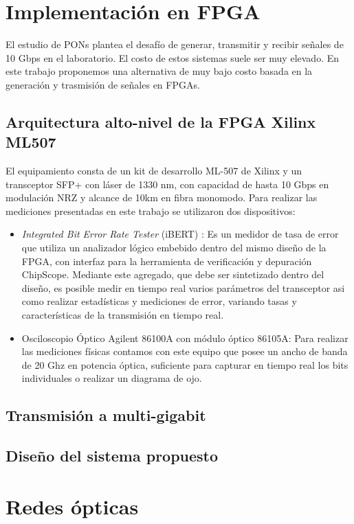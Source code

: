 \section{Implementación en FPGA}
El estudio de PONs plantea el desafío de generar, transmitir y recibir
señales de 10 Gbps en el laboratorio. El costo de estos sistemas
suele ser muy elevado. En este trabajo proponemos una alternativa de muy
bajo costo basada en la generación y trasmisión de señales en FPGAs.

\subsection{Arquitectura alto-nivel de la FPGA Xilinx ML507}
El equipamiento consta de un kit de desarrollo ML-507 de Xilinx y un
transceptor SFP+ con láser de 1330 nm, con capacidad de hasta 10 Gbps
en modulación NRZ y alcance de 10km en fibra monomodo. Para realizar
las mediciones presentadas en este trabajo se utilizaron dos dispositivos:
\begin{itemize}
 \item {\em Integrated Bit Error Rate Tester} (iBERT) \cite{4gtxs}: Es
un medidor de tasa de error que utiliza un analizador lógico embebido dentro
del mismo diseño de la FPGA, con interfaz para la herramienta de
verificación y depuración ChipScope. Mediante este agregado, que debe
ser sintetizado dentro del diseño, es posible medir en tiempo real
varios parámetros del transceptor asi como realizar estadísticas y
mediciones de error, variando tasas y características de la transmisión
en tiempo real.
 \item Osciloscopio Óptico Agilent 86100A con módulo óptico 86105A: Para
realizar las mediciones físicas contamos con este equipo que posee un
ancho de banda de 20 Ghz en potencia óptica, suficiente para capturar en
tiempo real los bits individuales o realizar un diagrama de ojo.
\end{itemize}
\subsection{Transmisión a multi-gigabit}
\subsection{Diseño del sistema propuesto}
\section{Redes ópticas}


